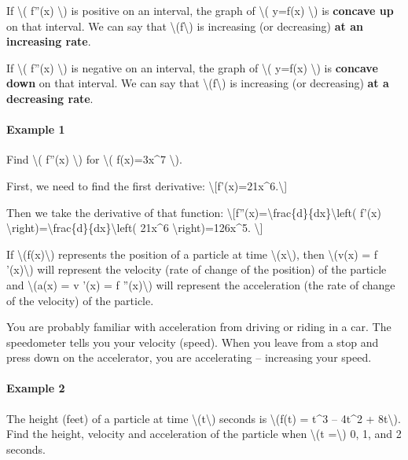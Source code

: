 If \textbackslash{}( f''(x) \textbackslash{}) is positive on an
interval, the graph of \textbackslash{}( y=f(x) \textbackslash{}) is
\textbf{concave up} on that interval. We can say that
\textbackslash{}(f\textbackslash{}) is increasing (or decreasing)
\textbf{at an increasing rate}.

If \textbackslash{}( f''(x) \textbackslash{}) is negative on an
interval, the graph of \textbackslash{}( y=f(x) \textbackslash{}) is
\textbf{concave down} on that interval. We can say that
\textbackslash{}(f\textbackslash{}) is increasing (or decreasing)
\textbf{at a decreasing rate}.

\hypertarget{example-1}{%
\paragraph{Example 1}\label{example-1}}

Find \textbackslash{}( f''(x) \textbackslash{}) for \textbackslash{}(
f(x)=3x\^{}7 \textbackslash{}).

First, we need to find the first derivative:
\textbackslash{}{[}f'(x)=21x\^{}6.\textbackslash{}{]}

Then we take the derivative of that function:
\textbackslash{}{[}f''(x)=\textbackslash{}frac\{d\}\{dx\}\textbackslash{}left(
f'(x)
\textbackslash{}right)=\textbackslash{}frac\{d\}\{dx\}\textbackslash{}left(
21x\^{}6 \textbackslash{}right)=126x\^{}5. \textbackslash{}{]}

If \textbackslash{}(f(x)\textbackslash{}) represents the position of a
particle at time \textbackslash{}(x\textbackslash{}), then
\textbackslash{}(v(x) = f '(x)\textbackslash{}) will represent the
velocity (rate of change of the position) of the particle and
\textbackslash{}(a(x) = v '(x) = f ''(x)\textbackslash{}) will represent
the acceleration (the rate of change of the velocity) of the particle.

You are probably familiar with acceleration from driving or riding in a
car. The speedometer tells you your velocity (speed). When you leave
from a stop and press down on the accelerator, you are accelerating --
increasing your speed.

\hypertarget{example-2}{%
\paragraph{Example 2}\label{example-2}}

The height (feet) of a particle at time
\textbackslash{}(t\textbackslash{}) seconds is \textbackslash{}(f(t) =
t\^{}3 -- 4t\^{}2 + 8t\textbackslash{}). Find the height, velocity and
acceleration of the particle when \textbackslash{}(t =\textbackslash{})
0, 1, and 2 seconds.

